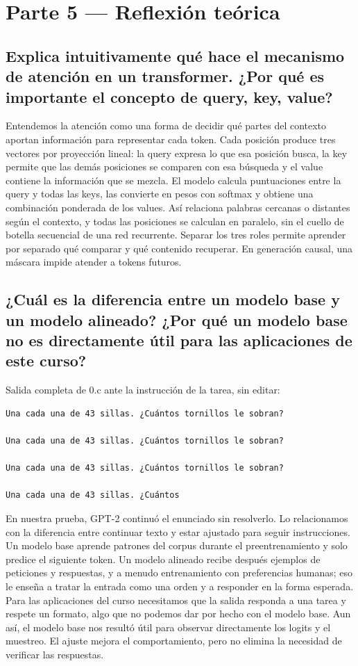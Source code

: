 \documentclass[runningheads]{llncs}
\begin{document}
\section{Parte 5 --- Reflexión teórica}
\subsection{Explica intuitivamente qué hace el mecanismo de atención en un transformer. ¿Por qué es importante el concepto de query, key, value?}
Entendemos la atención como una forma de decidir qué partes del contexto
aportan información para representar cada token. Cada posición produce tres
vectores por proyección lineal: la query expresa lo que esa posición busca, la
key permite que las demás posiciones se comparen con esa búsqueda y el value
contiene la información que se mezcla. El modelo calcula puntuaciones entre la
query y todas las keys, las convierte en pesos con softmax y obtiene una
combinación ponderada de los values. Así relaciona palabras cercanas o
distantes según el contexto, y todas las posiciones se calculan en paralelo,
sin el cuello de botella secuencial de una red recurrente. Separar los tres
roles permite aprender por separado qué comparar y qué contenido recuperar. En
generación causal, una máscara impide atender a tokens futuros.

\subsection{¿Cuál es la diferencia entre un modelo base y un modelo alineado? ¿Por qué un modelo base no es directamente útil para las aplicaciones de este curso?}
Salida completa de 0.c ante la instrucción de la tarea, sin editar:\begin{verbatim}
Una cada una de 43 sillas. ¿Cuántos tornillos le sobran?

Una cada una de 43 sillas. ¿Cuántos tornillos le sobran?

Una cada una de 43 sillas. ¿Cuántos tornillos le sobran?

Una cada una de 43 sillas. ¿Cuántos
\end{verbatim}En nuestra prueba, GPT-2 continuó el enunciado sin resolverlo. Lo relacionamos con la diferencia entre
continuar texto y estar ajustado para seguir instrucciones. Un modelo base
aprende patrones del corpus durante el preentrenamiento y solo predice el
siguiente token. Un modelo alineado recibe después ejemplos de peticiones y
respuestas, y a menudo entrenamiento con preferencias humanas; eso le enseña a
tratar la entrada como una orden y a responder en la forma esperada. Para las
aplicaciones del curso necesitamos que la salida responda a una tarea y
respete un formato, algo que no podemos dar por hecho con el modelo base. Aun
así, el modelo base nos resultó útil para observar directamente los logits y
el muestreo. El ajuste mejora el comportamiento, pero no elimina la necesidad
de verificar las respuestas.
\end{document}
